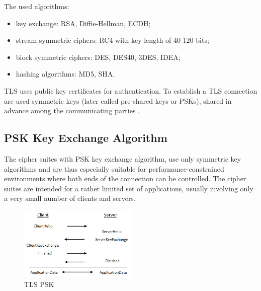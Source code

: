 \documentclass[
  digital, %
  notable,   %
  lof,     %
  lot,     %
]{fithesis3}
\begin{document}
The used algorithms:
\begin{itemize}[leftmargin=2em,rightmargin=1em,itemsep=0.75\parskip,parsep=0em,topsep=0em,partopsep=0em]
\item key exchange: RSA, Diffie-Hellman, ECDH;
\item stream symmetric ciphers: RC4 with key length of 40-120 bits;
\item block symmetric ciphers: DES, DES40, 3DES, IDEA;
\item hashing algorithms: MD5, SHA.
\end{itemize}
\vskip0.1in
TLS uses public key certificates for authentication. To establish a TLS connection are used 
symmetric keys (later called pre-shared keys or PSKs), shared in advance among the 
communicating parties \cite{eronen2005pre}.

\subsection{PSK Key Exchange Algorithm}
The cipher suites with PSK key exchange algorithm, use only symmetric key algorithms and are 
thus especially suitable for performance-constrained environments where both ends of the 
connection can be controlled. The cipher suites are intended for a rather limited set of 
applications, usually involving only a very small number of clients and servers.


\begin{figure}
	\vspace{-20pt}
    \begin{center}
   		\includegraphics[width=0.5\textwidth]{psk}
	\end{center}
    \vspace{-20pt}
    \caption{TLS PSK}
    \vspace{-10pt}
\end{figure}
\end{document}
